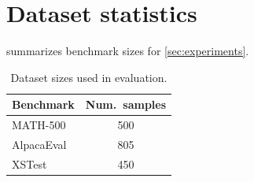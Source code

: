 \documentclass[11pt]{article}
\theoremstyle{plain}
\theoremstyle{definition}
\theoremstyle{remark}
\begin{document}
\section{Dataset statistics}
 summarizes benchmark sizes for \cref{sec:experiments}.

\begin{table}[h]
\centering
\begin{small}
\begin{sc}
\begin{tabular}{lc}
\toprule
\textbf{Benchmark} & \textbf{Num.\ samples} \\
\midrule
MATH-500 & 500 \\
AlpacaEval & 805 \\
XSTest & 450 \\
\bottomrule
\end{tabular}
\end{sc}
\end{small}
\caption{Dataset sizes used in evaluation.}
\label{tab:appendix-dataset-stats}
\end{table}
\end{document}

